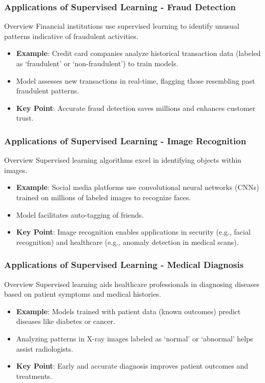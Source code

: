 \documentclass[aspectratio=169]{beamer}
\begin{document}
\begin{frame}[fragile]
  \frametitle{Applications of Supervised Learning - Fraud Detection}
  \begin{block}{Overview}
    Financial institutions use supervised learning to identify unusual patterns indicative of fraudulent activities.
  \end{block}
  \begin{itemize}
    \item \textbf{Example}: Credit card companies analyze historical transaction data (labeled as ‘fraudulent’ or ‘non-fraudulent’) to train models.
    \item Model assesses new transactions in real-time, flagging those resembling past fraudulent patterns.
    \item \textbf{Key Point}: Accurate fraud detection saves millions and enhances customer trust.
  \end{itemize}
\end{frame}

\begin{frame}[fragile]
  \frametitle{Applications of Supervised Learning - Image Recognition}
  \begin{block}{Overview}
    Supervised learning algorithms excel in identifying objects within images.
  \end{block}
  \begin{itemize}
    \item \textbf{Example}: Social media platforms use convolutional neural networks (CNNs) trained on millions of labeled images to recognize faces.
    \item Model facilitates auto-tagging of friends.
    \item \textbf{Key Point}: Image recognition enables applications in security (e.g., facial recognition) and healthcare (e.g., anomaly detection in medical scans).
  \end{itemize}
\end{frame}

\begin{frame}[fragile]
  \frametitle{Applications of Supervised Learning - Medical Diagnosis}
  \begin{block}{Overview}
    Supervised learning aids healthcare professionals in diagnosing diseases based on patient symptoms and medical histories.
  \end{block}
  \begin{itemize}
    \item \textbf{Example}: Models trained with patient data (known outcomes) predict diseases like diabetes or cancer.
    \item Analyzing patterns in X-ray images labeled as ‘normal’ or ‘abnormal’ helps assist radiologists.
    \item \textbf{Key Point}: Early and accurate diagnosis improves patient outcomes and treatments.
  \end{itemize}
\end{frame}
\end{document}
